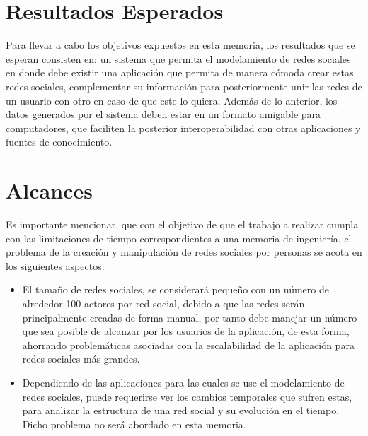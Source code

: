 
\section{Resultados Esperados} %
\label{sec:resultados_esperados}

Para llevar a cabo los objetivos expuestos en esta memoria, los resultados que se esperan consisten en: un sistema que permita el modelamiento de redes sociales en donde debe existir una aplicación que permita de manera cómoda crear estas redes sociales, complementar su información para posteriormente unir las redes de un usuario con otro en caso de que este lo quiera. Además de lo anterior, los datos generados por el sistema deben estar en un formato amigable para computadores, que faciliten la posterior interoperabilidad con otras aplicaciones y fuentes de conocimiento.


\section{Alcances} %
\label{sec:alcances}
% 

Es importante mencionar, que con el objetivo de que el trabajo a realizar cumpla con las limitaciones de tiempo correspondientes a una memoria de ingeniería, el problema de la creación y manipulación de redes sociales por personas se acota en los siguientes aspectos:

\begin{itemize}
  \item El tamaño de redes sociales, se considerará pequeño con un número de alrededor 100 actores por red social, debido a que las redes serán principalmente creadas de forma manual, por tanto debe manejar un número que sea posible de alcanzar por los usuarios de la aplicación, de esta forma, ahorrando problemáticas asociadas con la escalabilidad de la aplicación para redes sociales más grandes.
  \item Dependiendo de las aplicaciones para las cuales se use el modelamiento de redes sociales, puede requerirse ver los cambios temporales que sufren estas, para analizar la estructura de una red social y su evolución en el tiempo. Dicho problema no será abordado en esta memoria.
\end{itemize}
